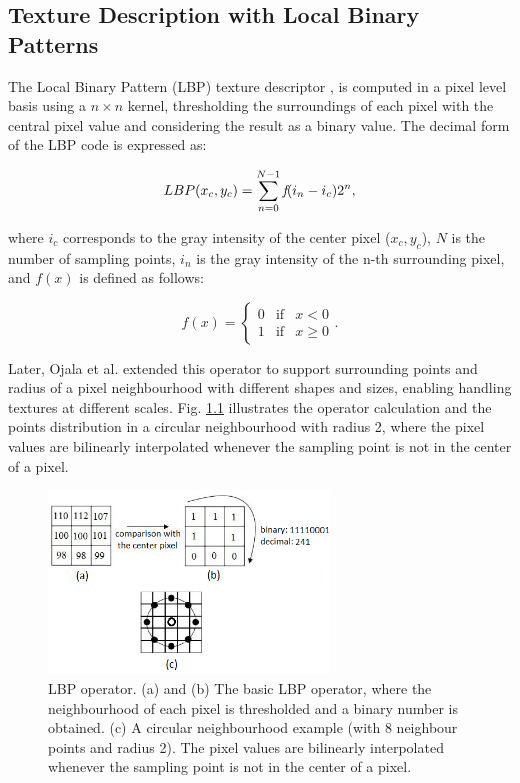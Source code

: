 \begin{appendices}
\chapter{Texture Description with Local Binary Patterns}
\label{AppendixA}

The Local Binary Pattern (LBP) texture descriptor \cite{ojala1996comparative}, is computed in a pixel level basis using a $n \times n$ kernel, thresholding the surroundings of each pixel with the central pixel value and considering the result as a binary value. The decimal form of the LBP code is expressed as:

\begin{equation}
LBP(x_{c},y_{c})=\displaystyle\sum\limits_{n=0}^{N-1} \emph{f}(i_{n}-i_{c})2^n,
\label{eq:LBP}
\end{equation}

\noindent where $i_{c}$ corresponds to the gray intensity of the center pixel ($x_{c}, y_{c}$), $N$ is the number of sampling points, $i_{n}$ is the gray intensity of the n-th surrounding pixel, and $f(x)$ is defined as follows:

\begin{equation}
f(x)  =
\left\lbrace \begin{array}{ccc}
0 & \mbox{if} & x<0 \\
1 & \mbox{if} & x\geq0 
\end{array}. \right.
\label{eq:fx}
\end{equation}

Later, Ojala et al. \cite{ojala2002multiresolution} extended this operator to support surrounding points and radius of a pixel neighbourhood with different shapes and sizes, enabling handling textures at different scales. Fig. \ref{fig_lbpOperator} illustrates the operator calculation and the points distribution in a circular neighbourhood with radius 2, where the pixel values are bilinearly interpolated whenever the sampling point is not in the center of a pixel.

\begin{figure}
\begin{center}
\includegraphics [width=7.5cm] {images/lbp_operator}
\caption{LBP operator. (a) and (b) The basic LBP operator, where the neighbourhood of each pixel is thresholded and a binary number is obtained. (c) A circular neighbourhood example (with 8 neighbour points and radius 2). The pixel values are bilinearly interpolated whenever the sampling point is not in the center of a pixel.} \label{fig_lbpOperator}
\end{center}
\end{figure}


\end{appendices}
